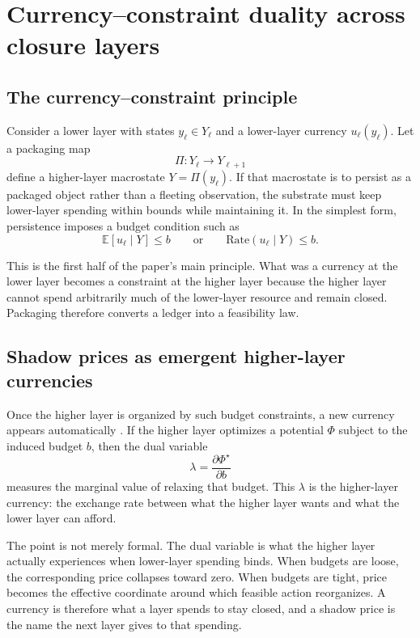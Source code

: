 \documentclass[11pt,a4paper]{article}
\newcommand{\E}{\mathbb{E}}
\begin{document}
\section{Currency--constraint duality across closure layers}\label{sec:morphism}

\subsection{The currency--constraint principle}

Consider a lower layer with states \(y_\ell\in Y_\ell\) and a lower-layer currency \(u_\ell(y_\ell)\). Let a packaging map
\[
\Pi:Y_\ell\to Y_{\ell+1}
\]
define a higher-layer macrostate \(Y=\Pi(y_\ell)\). If that macrostate is to persist as a packaged object rather than a fleeting observation, the substrate must keep lower-layer spending within bounds while maintaining it. In the simplest form, persistence imposes a budget condition such as
\[
\E[u_\ell\mid Y]\le b
\qquad\text{or}\qquad
\mathrm{Rate}(u_\ell\mid Y)\le b.
\]

This is the first half of the paper's main principle. What was a currency at the lower layer becomes a constraint at the higher layer because the higher layer cannot spend arbitrarily much of the lower-layer resource and remain closed. Packaging therefore converts a ledger into a feasibility law.

\subsection{Shadow prices as emergent higher-layer currencies}

Once the higher layer is organized by such budget constraints, a new currency appears automatically \cite{boyd2004convex}. If the higher layer optimizes a potential \(\Phi\) subject to the induced budget \(b\), then the dual variable
\[
\lambda=\frac{\partial \Phi^\star}{\partial b}
\]
measures the marginal value of relaxing that budget. This \(\lambda\) is the higher-layer currency: the exchange rate between what the higher layer wants and what the lower layer can afford.

The point is not merely formal. The dual variable is what the higher layer actually experiences when lower-layer spending binds. When budgets are loose, the corresponding price collapses toward zero. When budgets are tight, price becomes the effective coordinate around which feasible action reorganizes. A currency is therefore what a layer spends to stay closed, and a shadow price is the name the next layer gives to that spending.
\end{document}
